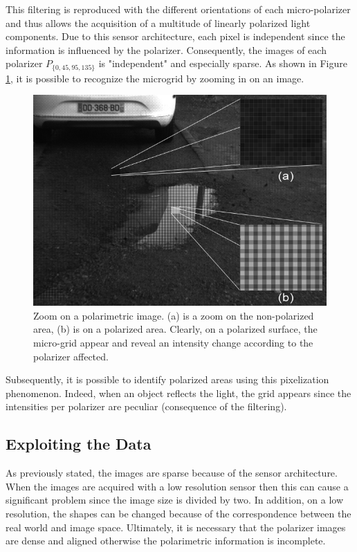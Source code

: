 This filtering is reproduced with the different orientations of each micro-polarizer and thus allows the acquisition of a multitude of linearly polarized light components. 
Due to this sensor architecture, each pixel is independent since the information is influenced by the polarizer. Consequently, the images of each polarizer $P_{\{0,45,95,135\}}$ is "independent" and especially sparse. As shown in Figure \ref{fig:polaexplain}, it is possible to recognize the microgrid by zooming in on an image.

\begin{figure}[h]
	\centering
	\includegraphics[width=0.6\linewidth]{Figures/VISAPP/polaexplain}
	\caption[Zoom on a polarimetric image.]{Zoom on a polarimetric image. (a) is a zoom on the non-polarized area, (b) is on a polarized area. Clearly, on a polarized surface, the micro-grid appear and reveal an intensity change according to the polarizer affected.}
	\label{fig:polaexplain}
\end{figure}

Subsequently, it is possible to identify polarized areas using this pixelization phenomenon. Indeed, when an object reflects the light, the grid appears since the intensities per polarizer are peculiar (consequence of the filtering).


\subsection{Exploiting the Data}\label{exploitdata}


As previously stated, the images are sparse because of the sensor architecture. When the images are acquired with a low resolution sensor then this can cause a significant problem since the image size is divided by two. In addition, on a low resolution, the shapes can be changed because of the correspondence between the real world and image space. Ultimately, it is necessary that the polarizer images are dense and aligned otherwise the polarimetric information is incomplete.

